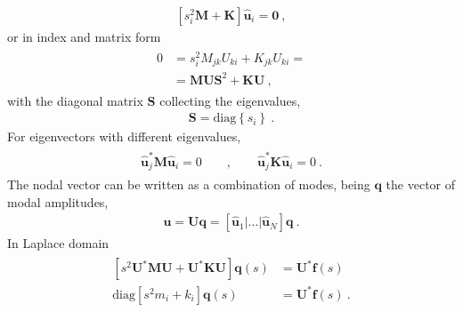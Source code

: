 \documentclass[letterpaper,10pt,english]{jupyterBook}
\begin{document}
\sphinxAtStartPar
{}
\begin{equation*}
\begin{split}\left[ s_i^2 \mathbf{M} + \mathbf{K} \right] \hat{\mathbf{u}}_i = \mathbf{0} \ ,\end{split}
\end{equation*}
\sphinxAtStartPar
or in index and matrix form
\begin{equation*}
\begin{split}\begin{aligned}
  0 & = s_i^2 M_{jk} U_{ki} + K_{jk} U_{ki} = \\
    & = \mathbf{M} \mathbf{U} \mathbf{S}^2 + \mathbf{K} \mathbf{U} \ ,
\end{aligned}\end{split}
\end{equation*}
\sphinxAtStartPar
with the diagonal matrix \(\mathbf{S}\) collecting the eigenvalues,
\begin{equation*}
\begin{split}\mathbf{S} = \text{diag} \left\{ s_i \right\} \ .\end{split}
\end{equation*}
\sphinxAtStartPar
{} For eigenvectors with different eigenvalues,
\begin{equation*}
\begin{split}\begin{aligned}
  \hat{\mathbf{u}}_j^* \mathbf{M} \hat{\mathbf{u}}_i = 0 \qquad , \qquad
  \hat{\mathbf{u}}_j^* \mathbf{K} \hat{\mathbf{u}}_i = 0 \ .
\end{aligned}\end{split}
\end{equation*}
\sphinxAtStartPar
{} The nodal vector can be written as a combination of modes, being \(\mathbf{q}\) the vector of modal amplitudes,
\begin{equation*}
\begin{split}\mathbf{u} = \mathbf{U} \mathbf{q} = \left[ \hat{\mathbf{u}}_1 | \dots | \hat{\mathbf{u}}_N \right] \mathbf{q} \ .\end{split}
\end{equation*}
\sphinxAtStartPar
{} In Laplace domain
\begin{equation*}
\begin{split}\begin{aligned}
  \left[ s^2 \mathbf{U}^* \mathbf{M} \mathbf{U} + \mathbf{U}^* \mathbf{K} \mathbf{U}\right] \mathbf{q}(s) & = \mathbf{U}^* \mathbf{f}(s) \\
  \text{diag}\left[ s^2 m_i + k_i \right] \mathbf{q}(s) & = \mathbf{U}^* \mathbf{f}(s) \ .
\end{aligned}\end{split}
\end{equation*}
\end{document}
